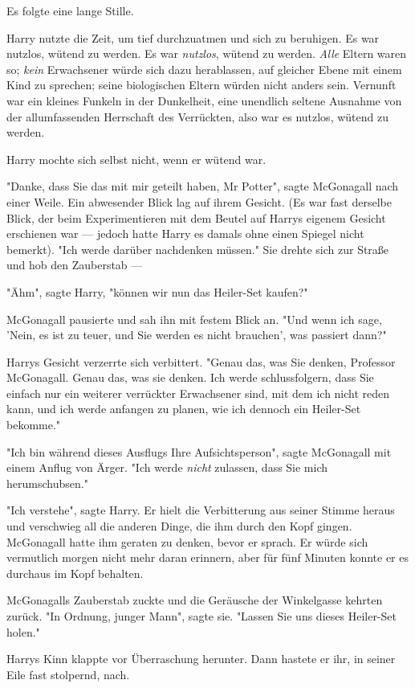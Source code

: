 {Es folgte eine lange Stille.

Harry nutzte die Zeit, um tief durchzuatmen und sich zu beruhigen. Es war nutzlos, wütend zu werden. Es war \emph{nutzlos}, wütend zu werden. \emph{Alle} Eltern waren so; \emph{kein} Erwachsener würde sich dazu herablassen, auf gleicher Ebene mit einem Kind zu sprechen; seine biologischen Eltern würden nicht anders sein. Vernunft war ein kleines Funkeln in der Dunkelheit, eine unendlich seltene Ausnahme von der allumfassenden Herrschaft des Verrückten, also war es nutzlos, wütend zu werden.

Harry mochte sich selbst nicht, wenn er wütend war.

"Danke, dass Sie das mit mir geteilt haben, Mr Potter", sagte McGonagall nach einer Weile. Ein abwesender Blick lag auf ihrem Gesicht. (Es war fast derselbe Blick, der beim Experimentieren mit dem Beutel auf Harrys eigenem Gesicht erschienen war --- jedoch hatte Harry es damals ohne einen Spiegel nicht bemerkt). "Ich werde darüber nachdenken müssen." Sie drehte sich zur Straße und hob den Zauberstab ---

"Ähm", sagte Harry, "können wir nun das Heiler-Set kaufen?"

McGonagall pausierte und sah ihn mit festem Blick an. "Und wenn ich sage, 'Nein, es ist zu teuer, und Sie werden es nicht brauchen', was passiert dann?"

Harrys Gesicht verzerrte sich verbittert. "Genau das, was Sie denken, Professor McGonagall. Genau das, was sie denken. Ich werde schlussfolgern, dass Sie einfach nur ein weiterer verrückter Erwachsener sind, mit dem ich nicht reden kann, und ich werde anfangen zu planen, wie ich dennoch ein Heiler-Set bekomme."

"Ich bin während dieses Ausflugs Ihre Aufsichtsperson", sagte McGonagall mit einem Anflug von Ärger. "Ich werde \emph{nicht} zulassen, dass Sie mich herumschubsen."

"Ich verstehe", sagte Harry. Er hielt die Verbitterung aus seiner Stimme heraus und verschwieg all die anderen Dinge, die ihm durch den Kopf gingen. McGonagall hatte ihm geraten zu denken, bevor er sprach. Er würde sich vermutlich morgen nicht mehr daran erinnern, aber für fünf Minuten konnte er es durchaus im Kopf behalten.

McGonagalls Zauberstab zuckte und die Geräusche der Winkelgasse kehrten zurück. "In Ordnung, junger Mann", sagte sie. "Lassen Sie uns dieses Heiler-Set holen."

Harrys Kinn klappte vor Überraschung herunter. Dann hastete er ihr, in seiner Eile fast stolpernd, nach.

}
